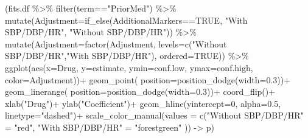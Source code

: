 \documentclass[
]{article}
\newenvironment{Shaded}{\begin{snugshade}}{\end{snugshade}}
\newcommand{\AttributeTok}[1]{\textcolor[rgb]{0.77,0.63,0.00}{#1}}
\newcommand{\ConstantTok}[1]{\textcolor[rgb]{0.00,0.00,0.00}{#1}}
\newcommand{\DecValTok}[1]{\textcolor[rgb]{0.00,0.00,0.81}{#1}}
\newcommand{\FloatTok}[1]{\textcolor[rgb]{0.00,0.00,0.81}{#1}}
\newcommand{\FunctionTok}[1]{\textcolor[rgb]{0.00,0.00,0.00}{#1}}
\newcommand{\NormalTok}[1]{#1}
\newcommand{\OtherTok}[1]{\textcolor[rgb]{0.56,0.35,0.01}{#1}}
\newcommand{\SpecialCharTok}[1]{\textcolor[rgb]{0.00,0.00,0.00}{#1}}
\newcommand{\StringTok}[1]{\textcolor[rgb]{0.31,0.60,0.02}{#1}}
\begin{document}
\begin{Shaded}
\begin{Highlighting}[]
\NormalTok{(fits.df  }\SpecialCharTok{\%\textgreater{}\%} 
  \FunctionTok{filter}\NormalTok{(term}\SpecialCharTok{==}\StringTok{"PriorMed"}\NormalTok{) }\SpecialCharTok{\%\textgreater{}\%} 
  \FunctionTok{mutate}\NormalTok{(}\AttributeTok{Adjustment=}\FunctionTok{if\_else}\NormalTok{(AdditionalMarkers}\SpecialCharTok{==}\ConstantTok{TRUE}\NormalTok{, }\StringTok{"With SBP/DBP/HR"}\NormalTok{, }\StringTok{"Without SBP/DBP/HR"}\NormalTok{)) }\SpecialCharTok{\%\textgreater{}\%} 
  \FunctionTok{mutate}\NormalTok{(}\AttributeTok{Adjustment=}\FunctionTok{factor}\NormalTok{(Adjustment, }\AttributeTok{levels=}\FunctionTok{c}\NormalTok{(}\StringTok{"Without SBP/DBP/HR"}\NormalTok{,}\StringTok{"With SBP/DBP/HR"}\NormalTok{), }\AttributeTok{ordered=}\ConstantTok{TRUE}\NormalTok{)) }\SpecialCharTok{\%\textgreater{}\%} 
  \FunctionTok{ggplot}\NormalTok{(}\FunctionTok{aes}\NormalTok{(}\AttributeTok{x=}\NormalTok{Drug, }\AttributeTok{y=}\NormalTok{estimate, }\AttributeTok{ymin=}\NormalTok{conf.low, }\AttributeTok{ymax=}\NormalTok{conf.high, }\AttributeTok{color=}\NormalTok{Adjustment))}\SpecialCharTok{+}
  \FunctionTok{geom\_point}\NormalTok{( }\AttributeTok{position=}\FunctionTok{position\_dodge}\NormalTok{(}\AttributeTok{width=}\FloatTok{0.3}\NormalTok{))}\SpecialCharTok{+}
  \FunctionTok{geom\_linerange}\NormalTok{( }\AttributeTok{position=}\FunctionTok{position\_dodge}\NormalTok{(}\AttributeTok{width=}\FloatTok{0.3}\NormalTok{))}\SpecialCharTok{+}
  \FunctionTok{coord\_flip}\NormalTok{()}\SpecialCharTok{+}
  \FunctionTok{xlab}\NormalTok{(}\StringTok{"Drug"}\NormalTok{)}\SpecialCharTok{+}
  \FunctionTok{ylab}\NormalTok{(}\StringTok{"Coefficient"}\NormalTok{)}\SpecialCharTok{+}
  \FunctionTok{geom\_hline}\NormalTok{(}\AttributeTok{yintercept=}\DecValTok{0}\NormalTok{, }\AttributeTok{alpha=}\FloatTok{0.5}\NormalTok{, }\AttributeTok{linetype=}\StringTok{"dashed"}\NormalTok{)}\SpecialCharTok{+}
  \FunctionTok{scale\_color\_manual}\NormalTok{(}\AttributeTok{values =} \FunctionTok{c}\NormalTok{(}\StringTok{"Without SBP/DBP/HR"} \OtherTok{=} \StringTok{"red"}\NormalTok{,}
                                    \StringTok{"With SBP/DBP/HR"} \OtherTok{=} \StringTok{"forestgreen"}
\NormalTok{                                    )) }\OtherTok{{-}\textgreater{}}\NormalTok{ p)}
\end{Highlighting}
\end{Shaded}
\end{document}
